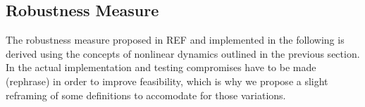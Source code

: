 




     
     

    

    

\subsection{Robustness Measure}

    The robustness measure proposed in REF and implemented in the following is derived using the concepts of nonlinear dynamics outlined in the previous section. In the actual implementation and testing compromises have to be made (rephrase) in order to improve feasibility, which is why we propose a slight reframing of some definitions to accomodate for those variations.
    
